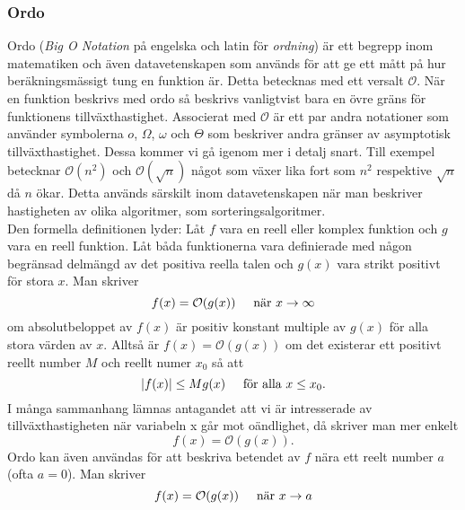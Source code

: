 \documentclass[a4]{article}
\begin{document}
\subsubsection{Ordo}
Ordo (\textit{Big O Notation} på engelska och latin för \textit{ordning}) är ett begrepp inom matematiken och även datavetenskapen som används för att ge ett mått på hur beräkningsmässigt tung en funktion är. Detta betecknas med ett versalt $\mathcal{O}$. När en funktion beskrivs med ordo så beskrivs vanligtvist bara en övre gräns för funktionens tillväxthastighet. Associerat med $\mathcal{O}$ är ett par andra notationer som använder symbolerna $o$, $\Omega$, $\omega$ och $\Theta$ som beskriver andra gränser av asymptotisk tillväxthastighet. Dessa kommer vi gå igenom mer i detalj snart. Till exempel betecknar $\mathcal{O}(n^2)$ och $\mathcal{O}(\sqrt{n})$ något som växer lika fort som $n^2$ respektive $\sqrt{n}$ då $n$ ökar. Detta används särskilt inom datavetenskapen när man beskriver hastigheten av olika algoritmer, som sorteringsalgoritmer. \cite{4, 5}\\
Den formella definitionen lyder: Låt $f$ vara en reell eller komplex funktion och $g$ vara en reell funktion. Låt båda funktionerna vara definierade med någon begränsad delmängd av det positiva reella talen och $g(x)$ vara strikt positivt för stora $x$. Man skriver \cite{6}
\begin{equation*}
    f(x)=\mathcal{O}(g(x))\hspace{5mm}\text{när }x\rightarrow\infty
\end{equation*}
om absolutbeloppet av $f(x)$ är positiv konstant multiple av $g(x)$ för alla stora värden av $x$. Alltså är $f(x)=\mathcal{O}(g(x))$ om det existerar ett positivt reellt number $M$ och reellt numer $x_0$ så att
\begin{equation*}
    |f(x)|\leq Mg(x)\hspace{5mm}\text{för alla }x\leq x_0.
\end{equation*}
I många sammanhang lämnas antagandet att vi är intresserade av tillväxthastigheten när variabeln x går mot oändlighet, då skriver man mer enkelt
\begin{equation*}
   f(x)=\mathcal{O}(g(x)).
\end{equation*}
Ordo kan även användas för att beskriva betendet av $f$ nära ett reelt number $a$ (ofta $a=0$). Man skriver
\begin{equation*}
   f(x)=\mathcal{O}(g(x))\hspace{5mm}\text{när }x\rightarrow a
\end{equation*}
\end{document}
